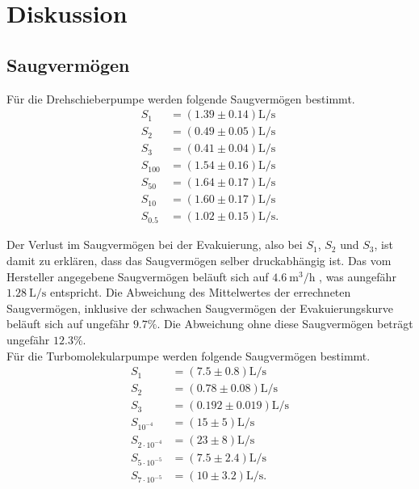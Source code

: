 \section{Diskussion}
\label{sec:Diskussion}

\subsection{Saugvermögen}

Für die Drehschieberpumpe werden folgende Saugvermögen bestimmt.
\begin{align*}
    S_1 &= (\num{1.39} \pm \num{0.14}) \si{\liter\per\second} \\
    S_2 &= (\num{0.49} \pm \num{0.05}) \si{\liter\per\second} \\
    S_3 &= (\num{0.41} \pm \num{0.04}) \si{\liter\per\second} \\
    S_{100} &= (\num{1.54} \pm \num{0.16}) \si{\liter\per\second} \\
    S_{50} &= (\num{1.64} \pm \num{0.17}) \si{\liter\per\second} \\
    S_{10} &= (\num{1.60} \pm \num{0.17}) \si{\liter\per\second} \\
    S_{\num{0.5}} &= (\num{1.02} \pm \num{0.15}) \si{\liter\per\second}.
\end{align*}

Der Verlust im Saugvermögen bei der Evakuierung, also bei $S_1$, $S_2$ und $S_3$, ist damit zu erklären, dass das Saugvermögen selber druckabhängig ist.
Das vom Hersteller angegebene Saugvermögen beläuft sich auf $\SI{4.6}{\meter\cubed\per\hour}$ \cite{delta_tu_dortmund}, was aungefähr $\SI{1.28}{\liter\per\second}$ entspricht.
Die Abweichung des Mittelwertes der errechneten Saugvermögen,  inklusive der schwachen Saugvermögen der Evakuierungskurve beläuft sich auf ungefähr $\num{9.7}\%$.
Die Abweichung ohne diese Saugvermögen beträgt ungefähr $\num{12.3}\%$. \\


Für die Turbomolekularpumpe werden folgende Saugvermögen bestimmt.
\begin{align*}
    S_1 &= (\num{7.5} \pm \num{0.8}) \si{\liter\per\second} \\
    S_2 &= (\num{0.78} \pm \num{0.08}) \si{\liter\per\second} \\
    S_3 &= (\num{0.192} \pm \num{0.019}) \si{\liter\per\second} \\
    S_{10^{-4}} &= (\num{15} \pm \num{5}) \si{\liter\per\second} \\
    S_{2 \cdot 10^{-4}} &= (\num{23} \pm \num{8}) \si{\liter\per\second} \\
    S_{5 \cdot 10^{-5}} &= (\num{7.5} \pm \num{2.4}) \si{\liter\per\second}\\
    S_{7 \cdot 10^{-5}} &= (\num{10} \pm \num{3.2}) \si{\liter\per\second}.
\end{align*}

